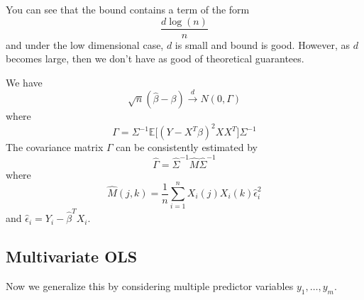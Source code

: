   You can see that the bound contains a term of the form 
  \begin{equation}
    \frac{d \log(n)}{n}
  \end{equation}
  and under the low dimensional case, $d$ is small and bound is good. However, as $d$ becomes large, then we don't have as good of theoretical guarantees. 

  \begin{theorem}
    We have 
    \begin{equation}
      \sqrt{n} (\hat{\beta} - \beta) \xrightarrow{d} N(0, \Gamma) 
    \end{equation}
    where 
    \begin{equation}
      \Gamma = \Sigma^{-1} \mathbb{E} \big[ (Y - X^T \beta)^2 X X^T \big] \Sigma^{-1}
    \end{equation}
    The covariance matrix $\Gamma$ can be consistently estimated by 
    \begin{equation}
      \hat{\Gamma} = \hat{\Sigma}^{-1} \hat{M} \hat{\Sigma}^{-1}
    \end{equation}
    where 
    \begin{equation}
      \hat{M} (j, k) = \frac{1}{n} \sum_{i=1}^n X_i (j) X_i (k) \hat{\epsilon}_i^2
    \end{equation}
    and $\hat{\epsilon}_i = Y_i - \hat{\beta}^T X_i$.
  \end{theorem}

\subsection{Multivariate OLS} 

  Now we generalize this by considering multiple predictor variables $y_1, \ldots, y_m$. 

